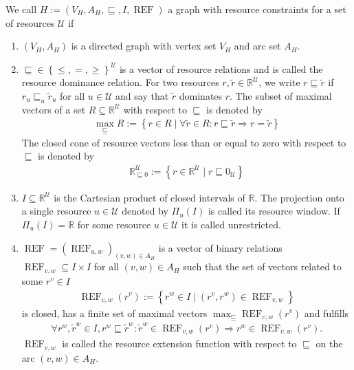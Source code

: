 \begin{definition}

We call ${H:=\left(V_H,A_H,\sqsubseteq,I,\operatorname{REF}\right)}$ a graph with resource constraints for a set of resources $\mathcal{U}$ if
\begin{enumerate}
	\item{$\left(V_H,A_H\right)$ is a directed graph with vertex set $V_H$ and arc set $A_H$.}
	\item{$\sqsubseteq\in\left\{\leq,=,\geq\right\}^{\mathcal{U}}$ is a vector of resource relations and is called the resource dominance relation.}
		For two resources ${r,\tilde{r}\in\mathbb{R}^{\mathcal{U}}}$, we write ${r\sqsubseteq\tilde{r}}$ if ${r_u\sqsubseteq_u \tilde{r}_u}$ for all $u\in\mathcal{U}$ and say that $\tilde{r}$ dominates $r$. The subset of maximal vectors of a set $R\subseteq\mathbb{R}^{\mathcal{U}}$ with respect to $\sqsubseteq$ is denoted by
		\begin{align*}
			\max_{\sqsubseteq} R := \left\{r\in R\mid \forall\tilde{r}\in R: r\sqsubseteq\tilde{r}\Rightarrow r=\tilde{r}\right\}
		\end{align*}
		The closed cone of resource vectors less than or equal to zero with respect to $\sqsubseteq$ is denoted by
		\begin{align*}
			\mathbb{R}^{\mathcal{U}}_{\sqsubseteq 0} := \left\{r\in\mathbb{R}^{\mathcal{U}}\mid r\sqsubseteq 0_{\mathcal{U}}\right\}
		\end{align*}
	\item{$I\subseteq\mathbb{R}^{\mathcal{U}}$ is the Cartesian product of closed intervals of $\mathbb{R}$.}
		The projection onto a single resource $u\in\mathcal{U}$ denoted by $\Pi_u(I)$ is called its resource window. If $\Pi_u(I)=\mathbb{R}$ for some resource $u\in\mathcal{U}$ it is called unrestricted.
	\item{$\operatorname{REF} = \left(\operatorname{REF}_{u,w}\right)_{(v,w)\in A_H}$}
		is a vector of binary relations ${\operatorname{REF}_{v,w}\subseteq I\times I}$ for all ${(v,w)\in A_H}$ such that the set of vectors related to some ${r^v\in I}$
		\begin{align*}
			\operatorname{REF}_{v,w}\left(r^v\right) := \left\{r^w\in I\mid \left(r^v,r^w\right)\in\operatorname{REF}_{v,w}\right\}
		\end{align*}
		is closed, has a finite set of maximal vectors ${\max_{\sqsubseteq}\operatorname{REF}_{v,w}\left(r^v\right)}$ and fulfills
		\begin{align*}
			\forall r^w,\tilde{r}^w\in I,r^w\sqsubseteq\tilde{r}^w : \tilde{r}^w\in\operatorname{REF}_{v,w}\left(r^v\right) \Rightarrow r^w\in\operatorname{REF}_{v,w}\left(r^v\right).
		\end{align*}
		$\operatorname{REF}_{v,w}$ is called the resource extension function with respect to $\sqsubseteq$ on the arc $(v,w)\in A_H$.
\end{enumerate}
	
\end{definition}


